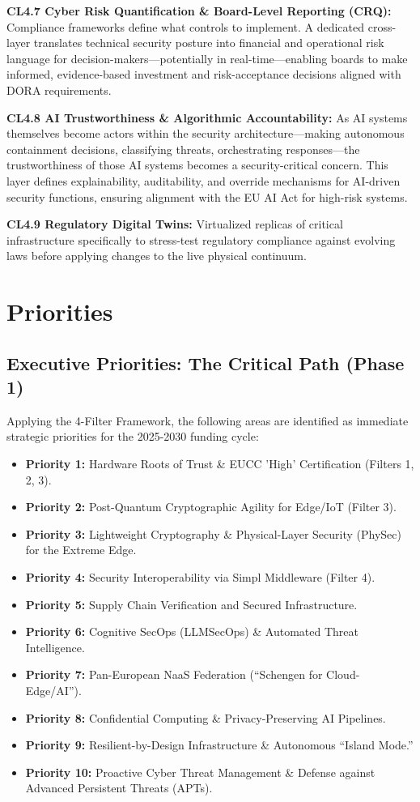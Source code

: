 \documentclass{ieeeaccess}
\begin{document}
\textbf{CL4.7 Cyber Risk Quantification \& Board-Level Reporting (CRQ):} Compliance frameworks define what controls to implement. A dedicated cross-layer translates technical security posture into financial and operational risk language for decision-makers---potentially in real-time---enabling boards to make informed, evidence-based investment and risk-acceptance decisions aligned with DORA requirements.

\textbf{CL4.8 AI Trustworthiness \& Algorithmic Accountability:} As AI systems themselves become actors within the security architecture---making autonomous containment decisions, classifying threats, orchestrating responses---the trustworthiness of those AI systems becomes a security-critical concern. This layer defines explainability, auditability, and override mechanisms for AI-driven security functions, ensuring alignment with the EU AI Act for high-risk systems.

\textbf{CL4.9 Regulatory Digital Twins:} Virtualized replicas of critical infrastructure specifically to stress-test regulatory compliance against evolving laws before applying changes to the live physical continuum.

\section{Priorities}
\subsection{Executive Priorities: The Critical Path (Phase 1)}
Applying the 4-Filter Framework, the following areas are identified as immediate strategic priorities for the 2025-2030 funding cycle:
\begin{itemize}
    \item \textbf{Priority 1:} Hardware Roots of Trust \& EUCC 'High' Certification (Filters 1, 2, 3).
    \item \textbf{Priority 2:} Post-Quantum Cryptographic Agility for Edge/IoT (Filter 3).
    \item \textbf{Priority 3:} Lightweight Cryptography \& Physical-Layer Security (PhySec) for the Extreme Edge.
    \item \textbf{Priority 4:} Security Interoperability via Simpl Middleware (Filter 4).
    \item \textbf{Priority 5:} Supply Chain Verification and Secured Infrastructure.
    \item \textbf{Priority 6:} Cognitive SecOps (LLMSecOps) \& Automated Threat Intelligence.
    \item \textbf{Priority 7:} Pan-European NaaS Federation (``Schengen for Cloud-Edge/AI'').
    \item \textbf{Priority 8:} Confidential Computing \& Privacy-Preserving AI Pipelines.
    \item \textbf{Priority 9:} Resilient-by-Design Infrastructure \& Autonomous ``Island Mode.''
    \item \textbf{Priority 10:} Proactive Cyber Threat Management \& Defense against Advanced Persistent Threats (APTs).
\end{itemize}
\end{document}
